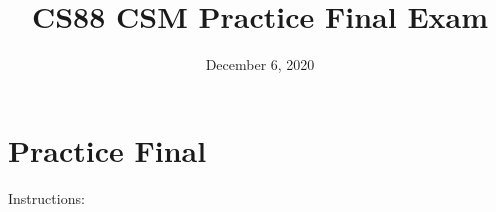 \documentclass{exam}
\title{CS88 CSM Practice Final Exam }
\date{December 6, 2020}
\begin{document}
\maketitle
\section{Practice Final}

{\LARGE Instructions:}









\end{document}
